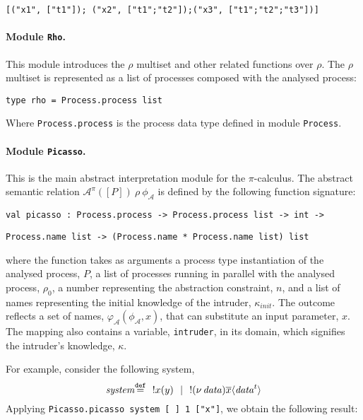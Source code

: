 \documentclass[10pt,a4paper,final,oneside,fleqn]{book}
\newcommand*{\eqdef}{\mathbin{\mathop{=}\limits^{\texttt{def}}}}
\begin{document}
\noindent
\texttt{[("x1", ["t1"]); ("x2", ["t1";"t2"]);("x3", ["t1";"t2";"t3"])]}

\paragraph{Module \texttt{Rho}.}  This module introduces the $\rho$ multiset and other related functions over $\rho$.  The $\rho$ multiset is represented as a list of processes composed with the analysed process:\vspace{6mm}

\noindent
\texttt{type rho = Process.process list}\vspace{6mm}

\noindent
Where \texttt{Process.process} is the process data type defined in module \texttt{Process}.

\paragraph{Module \texttt{Picasso}.} This is the main abstract interpretation module for the $\pi$-calculus. The abstract semantic relation $\mathcal{A}^{\pi}(\![P]\!)~\rho~\phi_\mathcal{A}$ is defined by the following function signature:\vspace{5mm}

\noindent
\texttt{val picasso : Process.process ->  Process.process list -> int ->}

\noindent
\texttt{Process.name list -> (Process.name * Process.name list) list}\vspace{6mm}

\noindent
where the function takes as arguments a process type instantiation of the analysed process, $P$, a list of processes running in parallel with the analysed process, $\rho_0$, a number representing the abstraction constraint, $n$, and a list of names representing the initial knowledge of the intruder, $\kappa_{init}$.  The outcome reflects a set of names, $\varphi_\mathcal{A}(\phi_\mathcal{A},x)$, that can substitute an input parameter, $x$. The mapping also contains a variable, \texttt{intruder}, in its domain, which signifies the intruder's knowledge, $\kappa$.

For example, consider the following system,
\[\mbox{{\itshape system\/}}\eqdef~~!x(y)~~|~~!(\nu~\!\mbox{{\itshape data\/}})\overline{x}\langle\mbox{{\itshape data\/}}^t\rangle\]
Applying \texttt{Picasso.picasso system [~] 1 ["x"]}, we obtain the following result:\vspace{6mm}
\end{document}
